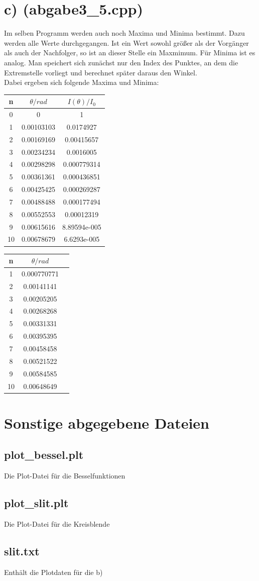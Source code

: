 \documentclass{scrartcl}
\begin{document}
\section*{c) (abgabe3\_5.cpp)}
Im selben Programm werden auch noch Maxima und Minima bestimmt. Dazu werden alle Werte durchgegangen. Ist ein Wert sowohl größer als der Vorgänger als auch der Nachfolger, so ist an dieser Stelle ein Maxmimum. Für Minima ist es analog. Man speichert sich zunächst nur den Index des Punktes, an dem die Extremstelle vorliegt und berechnet später daraus den Winkel.\\
Dabei ergeben sich folgende Maxima und Minima:\\
\begin{center}
\begin{tabular}{ccc}
\toprule
n & $\theta/rad$ & $I(\theta)/I_0$\\
\midrule
0 & 0 & 1\\
1 & 0.00103103 & 0.0174927\\
2 & 0.00169169 & 0.00415657\\
3 & 0.00234234 & 0.0016005\\
4 & 0.00298298 & 0.000779314\\
5 & 0.00361361 & 0.000436851\\
6 & 0.00425425 & 0.000269287\\
7 & 0.00488488 & 0.000177494\\
8 & 0.00552553 & 0.00012319\\
9 & 0.00615616 & 8.89594e-005\\
10 & 0.00678679 & 6.6293e-005\\
\bottomrule
\end{tabular}
\end{center}

\begin{center}
\begin{tabular}{ccc}
\toprule
n & $\theta/rad$\\
\midrule
1 & 0.000770771\\
2 & 0.00141141\\
3 & 0.00205205\\
4 & 0.00268268\\
5 & 0.00331331\\
6 & 0.00395395\\
7 & 0.00458458\\
8 & 0.00521522\\
9 & 0.00584585\\
10 & 0.00648649\\
\bottomrule
\end{tabular}
\end{center}

\section*{Sonstige abgegebene Dateien}
\subsection*{plot\_bessel.plt}
Die Plot-Datei für die Besselfunktionen
\subsection*{plot\_slit.plt}
Die Plot-Datei für die Kreisblende
\subsection*{slit.txt}
Enthält die Plotdaten für die b)
\end{document}
